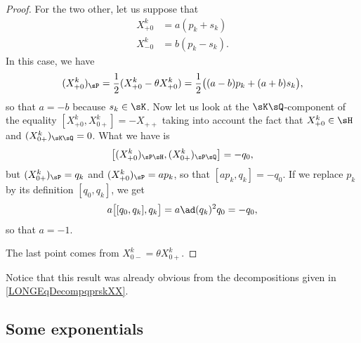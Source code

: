 \begin{proof}
	For the two other, let us suppose that
	\begin{subequations}
		\begin{align}
			X_{+0}^k & =a(p_k+s_k)  \\
			X_{-0}^k & =b(p_k-s_k).
		\end{align}
	\end{subequations}
	In this case, we have
	\begin{equation}
		(X_{+0}^k)_{\sP}=\frac{ 1 }{2}(X_{+0}^k-\theta X_{+0}^k)
		=\frac{ 1 }{2}\big( (a-b)p_k+(a+b)s_k \big),
	\end{equation}
	so that $a=-b$ because $s_k\in \sK$. Now let us look at the $\sK\sQ$-component of the equality $[X_{+0}^k,X_{0+}^k]=-X_{++}$ taking into account the fact that $X_{+0}^k\in\sH$ and $(X_{0+}^k)_{\sK\sQ}=0$. What we have is
	\begin{equation}
		\big[ (X_{+0}^k)_{\sP\sH},(X_{0+}^k)_{\sP\sQ} \big]=-q_0,
	\end{equation}
	but $(X_{0+}^k)_{\sP}=q_k$ and $(X_{+0}^k)_{\sP}=ap_k$, so that $[ap_k,q_k]=-q_0$. If we replace $p_k$ by its definition $[q_0,q_k]$, we get
	\begin{equation}
		a\big[ [q_0,q_k],q_k \big]=a\ad(q_k)^2q_0=-q_0,
	\end{equation}
	so that $a=-1$.

	The last point comes from $X_{0-}^k=\theta X_{0+}^k$.

\end{proof}
Notice that this result was already obvious from the decompositions given in \eqref{LONGEqDecompqprskXX}.


%
\subsection{Some exponentials}
%
\label{LONGSubSecSomeExpo}

